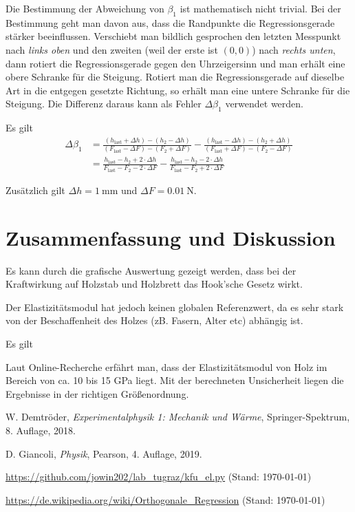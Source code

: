 \documentclass{article}
\begin{document}
Die Bestimmung der Abweichung von $\beta_1$ ist mathematisch nicht trivial. Bei der Bestimmung geht man davon aus, dass die Randpunkte die Regressionsgerade stärker beeinflussen. Verschiebt man bildlich gesprochen den letzten Messpunkt nach \textit{links oben} und den zweiten (weil der erste ist $(0,0)$) nach \textit{rechts unten}, dann rotiert die Regressionsgerade gegen den Uhrzeigersinn und man erhält eine obere Schranke für die Steigung. Rotiert man die Regressionsgerade auf dieselbe Art in die entgegen gesetzte Richtung, so erhält man eine untere Schranke für die Steigung. Die Differenz daraus kann als Fehler $\Delta\beta_1$ verwendet werden.


Es gilt
\begin{align}
\Delta \beta_1 &= \frac{ (h_\text{last} + \Delta h) - (h_2 - \Delta h)}{(F_\text{last} -\Delta F)  - (F_2 + \Delta F)} - \frac{ (h_\text{last} - \Delta h) - (h_2 + \Delta h)}{(F_\text{last} +\Delta F)  - (F_2 - \Delta F)} \\
&= \frac{ h_\text{last} - h_2 + 2\cdot \Delta h}{F_\text{last} - F_2 - 2\cdot \Delta F} - \frac{ h_\text{last} - h_2 - 2\cdot \Delta h}{F_\text{last} - F_2 + 2\cdot \Delta F}
\end{align}

Zusätzlich gilt $\Delta h = 1~$mm und $\Delta F = 0.01~$N.

\newpage
\section{Zusammenfassung und Diskussion}

Es kann durch die grafische Auswertung gezeigt werden, dass bei der Kraftwirkung auf Holzstab und Holzbrett das Hook'sche Gesetz wirkt. 

Der Elastizitätsmodul hat jedoch keinen globalen Referenzwert, da es sehr stark von der Beschaffenheit des Holzes (zB. Fasern, Alter etc) abhängig ist.

Es gilt


Laut Online-Recherche erfährt man, dass der Elastizitätsmodul von Holz im Bereich von ca. 10 bis 15 GPa liegt. Mit der berechneten Unsicherheit liegen die Ergebnisse in der richtigen Größenordnung.

\begin{thebibliography}{9}
 W. Demtröder, \emph{Experimentalphysik 1: Mechanik und Wärme}, Springer-Spektrum, 8. Auflage, 2018.

 D. Giancoli, \emph{Physik}, Pearson, 4. Auflage, 2019.

 \url{https://github.com/jowin202/lab_tugraz/kfu_el.py} (Stand: \today)

 \url{https://de.wikipedia.org/wiki/Orthogonale_Regression} (Stand: \today)

\end{thebibliography}
\end{document}
